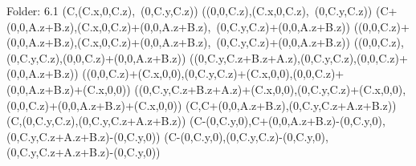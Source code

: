 Folder: 6.1
\left(C,\left(C.x,0,C.z\right),\ \left(0,C.y,C.z\right)\right)
\left(\left(0,0,C.z\right),\left(C.x,0,C.z\right),\ \left(0,C.y,C.z\right)\right)
\left(C+\left(0,0,A.z+B.z\right),\left(C.x,0,C.z\right)+\left(0,0,A.z+B.z\right),\ \left(0,C.y,C.z\right)+\left(0,0,A.z+B.z\right)\right)
\left(\left(0,0,C.z\right)+\left(0,0,A.z+B.z\right),\left(C.x,0,C.z\right)+\left(0,0,A.z+B.z\right),\ \left(0,C.y,C.z\right)+\left(0,0,A.z+B.z\right)\right)
\left(\left(0,0,C.z\right),\left(0,C.y,C.z\right),\left(0,0,C.z\right)+\left(0,0,A.z+B.z\right)\right)
\left(\left(0,C.y,C.z+B.z+A.z\right),\left(0,C.y,C.z\right),\left(0,0,C.z\right)+\left(0,0,A.z+B.z\right)\right)
\left(\left(0,0,C.z\right)+\left(C.x,0,0\right),\left(0,C.y,C.z\right)+\left(C.x,0,0\right),\left(0,0,C.z\right)+\left(0,0,A.z+B.z\right)+\left(C.x,0,0\right)\right)
\left(\left(0,C.y,C.z+B.z+A.z\right)+\left(C.x,0,0\right),\left(0,C.y,C.z\right)+\left(C.x,0,0\right),\left(0,0,C.z\right)+\left(0,0,A.z+B.z\right)+\left(C.x,0,0\right)\right)
\left(C,C+\left(0,0,A.z+B.z\right),\left(0,C.y,C.z+A.z+B.z\right)\right)
\left(C,\left(0,C.y,C.z\right),\left(0,C.y,C.z+A.z+B.z\right)\right)
\left(C-\left(0,C.y,0\right),C+\left(0,0,A.z+B.z\right)-\left(0,C.y,0\right),\left(0,C.y,C.z+A.z+B.z\right)-\left(0,C.y,0\right)\right)
\left(C-\left(0,C.y,0\right),\left(0,C.y,C.z\right)-\left(0,C.y,0\right),\left(0,C.y,C.z+A.z+B.z\right)-\left(0,C.y,0\right)\right)

